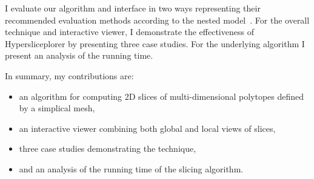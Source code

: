 I evaluate our algorithm and interface in two ways representing their recommended
evaluation methods according to the nested
model~\cite{Munzner:2009}. For the overall technique and
interactive viewer, I demonstrate the effectiveness of Hypersliceplorer by
presenting three case studies. For the underlying algorithm I present an
analysis of the running time. 

In summary, my contributions are:
\begin{itemize}
\item
  an algorithm for computing 2D slices of multi-dimensional polytopes defined by a
  simplical mesh,
\item
  an interactive viewer combining both global and local views of slices,
\item
  three case studies demonstrating the technique,
\item
  and an analysis of the running time of the slicing algorithm.
\end{itemize}

